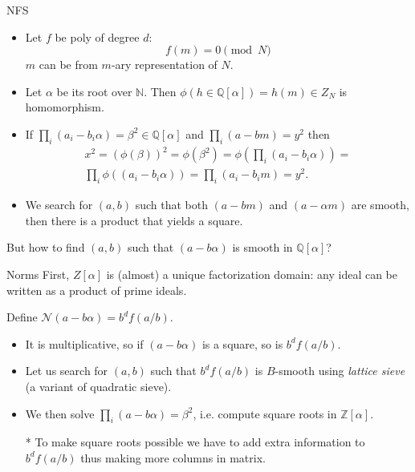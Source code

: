 \documentclass[t]{beamer}
\begin{document}
\begin{frame}{NFS}
    \begin{itemize}
        \item Let $f$ be poly of degree $d$:
    $$
    f(m) = 0 \pmod{N}
    $$
    $m$ can be from $m$-ary representation of $N$.
   \pause \item  Let $\alpha$ be its root over $\mathbb{N}$. Then $\phi(h\in \mathbb{Q}[\alpha]) =h(m)\in Z_N$ is homomorphism.
    
    
\pause    \item If $\prod_i (a_i-b_i\alpha) = \beta^2\in \mathbb{Q}[\alpha]$ and $\prod_i(a-bm)=y^2$ then
    \begin{multline*}
    x^2 = (\phi(\beta))^2= \phi(\beta^2) = \phi(\prod_i (a_i-b_i\alpha)) = \\
    \prod_i \phi((a_i-b_i\alpha)) = 
    \prod_i (a_i-b_im) = y^2.
    \end{multline*}
\item We search for $(a,b)$ such that both $(a-bm)$  and $(a-\alpha m)$ are smooth, then there is a product that yields a square.
 \end{itemize}
   But how to find $(a,b)$ such that $(a-b\alpha)$ is smooth in $\mathbb{Q}[\alpha]$? %

\end{frame}

\begin{frame}{Norms}
First, $Z[\alpha]$ is (almost) a unique factorization domain: any ideal can be written as a product of prime ideals.

    Define $\mathcal{N}(a-b\alpha) = b^df(a/b)$.
    \begin{itemize}
        \item It is multiplicative, so if $(a-b\alpha) $ is a square, so is $ b^df(a/b)$.
        \item Let us search for $(a,b)$ such that $b^df(a/b)$ is $B$-smooth using \emph{lattice sieve} (a variant of quadratic sieve). 
        \item We then solve   $\prod_i(a-b\alpha) = \beta^2$, i.e. compute square roots in $\mathbb{Z}[\alpha]$.
        \item[*] To make square roots possible we have to add extra information to $b^df(a/b)$ thus making more columns in matrix.
    \end{itemize}
\end{frame}
\end{document}
